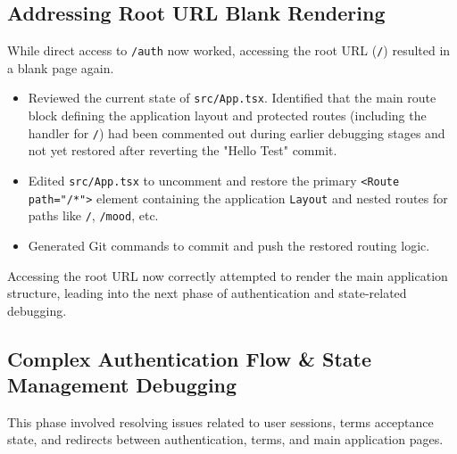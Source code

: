 \documentclass[11pt]{article} %
\begin{document}
\subsection{Addressing Root URL Blank Rendering}
\begin{description}[style=unboxed,leftmargin=0pt]
    \item[Problem:] While direct access to \texttt{/auth} now worked, accessing the root URL (\texttt{/}) resulted in a blank page again.
    \item[AI Assistance (Diagnosis \& Implementation):]
        \begin{itemize}
            \item Reviewed the current state of \texttt{src/App.tsx}. Identified that the main route block defining the application layout and protected routes (including the handler for \texttt{/}) had been commented out during earlier debugging stages and not yet restored after reverting the "Hello Test" commit.
            \item Edited \texttt{src/App.tsx} to uncomment and restore the primary \texttt{<Route path="/*">} element containing the application \texttt{Layout} and nested routes for paths like \texttt{/}, \texttt{/mood}, etc.
            \item Generated Git commands to commit and push the restored routing logic.
        \end{itemize}
    \item[Outcome:] Accessing the root URL now correctly attempted to render the main application structure, leading into the next phase of authentication and state-related debugging.
\end{description}

\subsection{Complex Authentication Flow \& State Management Debugging}
This phase involved resolving issues related to user sessions, terms acceptance state, and redirects between authentication, terms, and main application pages.
\end{document}
